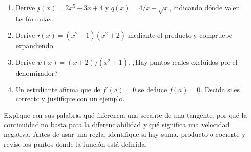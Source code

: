 \documentclass[10pt,a5paper]{article}
\newif\ifmostrarSoluciones
\begin{document}
\begin{ejercicios}
\begin{enumerate}
  \item Derive $p(x)=2x^5-3x+4$ y $q(x)=4/x+\sqrt{x}$, indicando dónde valen las fórmulas.
  \item Derive $r(x)=(x^2-1)(x^2+2)$ mediante el producto y compruebe expandiendo.
  \item Derive $w(x)=(x+2)/(x^2+1)$. ¿Hay puntos reales excluidos por el denominador?
  \item Un estudiante afirma que de $f'(a)=0$ se deduce $f(a)=0$. Decida si es correcto y justifique con un ejemplo.
\end{enumerate}
\end{ejercicios}
\ifmostrarSoluciones
\begin{solucion}[de reglas y resultados]
\begin{enumerate}
  \item $p'(x)=10x^4-3$ en $\mathbb{R}$. Para $q$, la derivada es $q'(x)=-4/x^2+1/(2\sqrt{x})$, válida para $x>0$.
  \item $r'(x)=2x(x^2+2)+2x(x^2-1)=4x^3+2x$. La expansión $r(x)=x^4+x^2-2$ da el mismo resultado.
  \item $w'(x)=[x^2+1-2x(x+2)]/(x^2+1)^2=(-x^2-4x+1)/(x^2+1)^2$. Vale para todo $x\in\mathbb{R}$, pues $x^2+1>0$.
  \item Es falso. Por ejemplo, $f(x)=x^2+3$ satisface $f'(0)=0$ y $f(0)=3$. Una pendiente nula no implica altura nula.
\end{enumerate}
\end{solucion}
\fi

\begin{nota}[Síntesis]
Explique con sus palabras qué diferencia una secante de una tangente, por qué la continuidad no basta para la diferenciabilidad y qué significa una velocidad negativa. Antes de usar una regla, identifique si hay suma, producto o cociente y revise los puntos donde la función está definida.
\end{nota}

\end{document}

